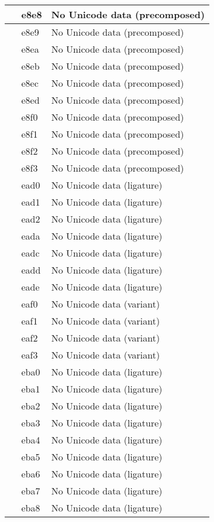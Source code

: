 \documentclass[12pt,letterpaper,openany]{book}
\begin{document}
\begin{center}
\begin{supertabular}{|m{0.25in}|m{0.5in}|m{4in}|}
 & e8e8 & No Unicode data (precomposed)\\\hline
 & e8e9 & No Unicode data (precomposed)\\\hline
 & e8ea & No Unicode data (precomposed)\\\hline
 & e8eb & No Unicode data (precomposed)\\\hline
 & e8ec & No Unicode data (precomposed)\\\hline
 & e8ed & No Unicode data (precomposed)\\\hline
 & e8f0 & No Unicode data (precomposed)\\\hline
 & e8f1 & No Unicode data (precomposed)\\\hline
 & e8f2 & No Unicode data (precomposed)\\\hline
 & e8f3 & No Unicode data (precomposed)\\\hline
 & ead0 & No Unicode data (ligature)\\\hline
 & ead1 & No Unicode data (ligature)\\\hline
 & ead2 & No Unicode data (ligature)\\\hline
 & eada & No Unicode data (ligature)\\\hline
 & eadc & No Unicode data (ligature)\\\hline
 & eadd & No Unicode data (ligature)\\\hline
 & eade & No Unicode data (ligature)\\\hline
 & eaf0 & No Unicode data (variant)\\\hline
 & eaf1 & No Unicode data (variant)\\\hline
 & eaf2 & No Unicode data (variant)\\\hline
 & eaf3 & No Unicode data (variant)\\\hline
 & eba0 & No Unicode data (ligature)\\\hline
 & eba1 & No Unicode data (ligature)\\\hline
 & eba2 & No Unicode data (ligature)\\\hline
 & eba3 & No Unicode data (ligature)\\\hline
 & eba4 & No Unicode data (ligature)\\\hline
 & eba5 & No Unicode data (ligature)\\\hline
 & eba6 & No Unicode data (ligature)\\\hline
 & eba7 & No Unicode data (ligature)\\\hline
 & eba8 & No Unicode data (ligature)\\\hline

\end{supertabular}
\end{center}
\end{document}
